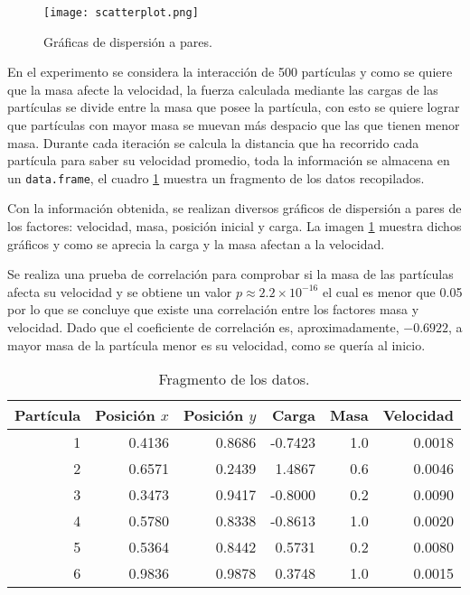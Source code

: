 \documentclass[12pt,letterpaper]{article}
\begin{document}
\begin{figure}
\centering
\texttt{[image: scatterplot.png]} 		
 		\caption{Gráficas de dispersión a pares.}
 		\label{4}
\end{figure}

En el experimento se considera la interacción de 500 partículas y como se quiere que la masa afecte la velocidad, la fuerza calculada mediante las cargas de las partículas se divide entre la masa que posee la partícula, con esto se quiere lograr que partículas con mayor masa se muevan más despacio que las que tienen menor masa. Durante cada iteración se calcula la distancia que ha recorrido cada partícula para saber su velocidad promedio, toda la información se almacena en un \texttt{data.frame}, el cuadro \ref{data} muestra un fragmento de los datos recopilados.

Con la información obtenida, se realizan diversos gráficos de dispersión a pares de los factores: velocidad, masa, posición inicial y carga. La imagen \ref{4} muestra dichos gráficos y como se aprecia la carga y la masa afectan a la velocidad.

Se realiza una prueba de correlación para comprobar si la masa de las partículas afecta su velocidad y se obtiene un valor $p \approx 2.2\times 10^{-16}$ el cual es menor que 0.05 por lo que se concluye que existe una correlación entre los factores masa y velocidad. Dado que el coeficiente de correlación es, aproximadamente, $-0.6922$, a mayor masa de la partícula menor es su velocidad, como se quería al inicio.
\begin{table}
\centering
\caption{Fragmento de los datos.}
\begin{tabular}{rrrrrr}
  \hline
Partícula & Posición $x$ & Posición $y$ & Carga & Masa &Velocidad\\ 
  \hline
1 & 0.4136 & 0.8686 & -0.7423 & 1.0 & 0.0018 \\ 
2 & 0.6571 & 0.2439 & 1.4867 & 0.6 & 0.0046 \\ 
3 & 0.3473 & 0.9417 & -0.8000 & 0.2 & 0.0090\\ 
4 & 0.5780 & 0.8338 & -0.8613 & 1.0 & 0.0020 \\
5 & 0.5364 & 0.8442 & 0.5731 & 0.2 & 0.0080 \\
6 & 0.9836 & 0.9878 & 0.3748 & 1.0 & 0.0015\\
\hline
\end{tabular}
\label{data}
\end{table}
 

\end{document}
